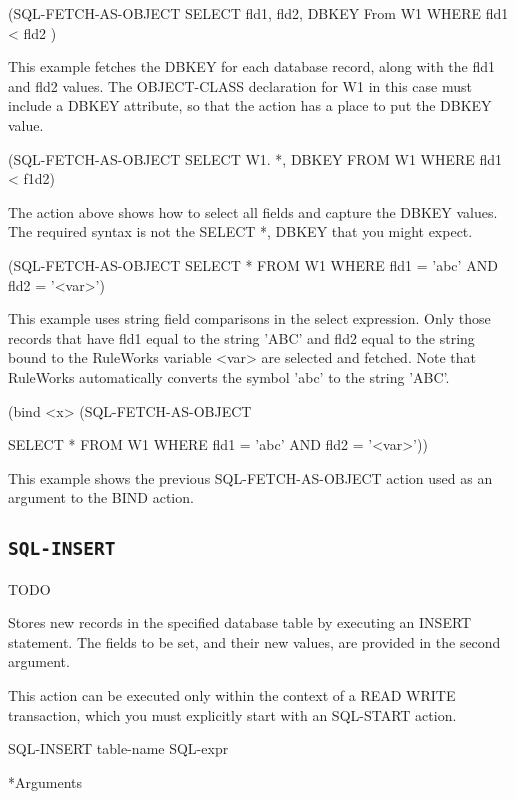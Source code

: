 {{(SQL-FETCH-AS-OBJECT SELECT fld1, fld2, DBKEY From W1 WHERE
fld1 < fld2 )



This example fetches the DBKEY for each database record,
along with the fld1 and fld2 values. The OBJECT-CLASS
declaration for W1 in this case must include a DBKEY
attribute, so that the action has a place to put the DBKEY
value.



(SQL-FETCH-AS-OBJECT SELECT W1. *, DBKEY FROM W1 WHERE fld1 <
f1d2)



The action above shows how to select all fields and capture
the DBKEY values. The required syntax is not the SELECT *,
DBKEY that you might expect.



(SQL-FETCH-AS-OBJECT SELECT * FROM W1 WHERE fld1 = 'abc' AND
fld2 = '<var>')



This example uses string field comparisons in the select
expression. Only those records that have fld1 equal to the
string 'ABC' and fld2 equal to the string bound to the
RuleWorks variable <var> are selected and fetched. Note that
RuleWorks automatically converts the symbol 'abc' to the
string 'ABC'.



(bind <x> (SQL-FETCH-AS-OBJECT

SELECT * FROM W1 WHERE fld1 = 'abc' AND fld2 = '<var>'))



This example shows the previous SQL-FETCH-AS-OBJECT action
used as an argument to the BIND action.

\subsection{\tt{SQL-INSERT}}
TODO

Stores new records in the specified database table by
executing an INSERT statement. The fields to be set, and
their new values, are provided in the second argument.

This action can be executed only within the context of a READ
WRITE transaction, which you must explicitly start with an
SQL-START action.



\Format

SQL-INSERT table-name SQL-expr



*Arguments

}}
